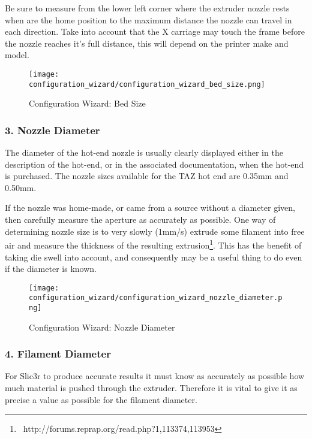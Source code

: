 Be sure to measure from the lower left corner where the extruder nozzle rests when are the home position to the maximum distance the nozzle can travel in each direction.  Take into account that the X carriage may touch the frame before the nozzle reaches it's full distance, this will depend on the printer make and model.

\begin{figure}[H]
\centering
\texttt{[image: configuration\_wizard/configuration\_wizard\_bed\_size.png]}
\caption{Configuration Wizard: Bed Size}
\label{fig:configuration_wizard_bed_size}
\end{figure}

\newpage
\subsubsection{3. Nozzle Diameter}
\label{sub:3_nozzle_diameter}
The diameter of the hot-end nozzle is usually clearly displayed either in the description of the hot-end, or in the associated documentation, when the hot-end is purchased.  The nozzle sizes available for the TAZ hot end are 0.35mm and 0.50mm.

If the nozzle was home-made, or came from a source without a diameter given, then carefully measure the aperture as accurately as possible.  One way of determining nozzle size is to very slowly (1mm/s) extrude some filament into free air and measure the thickness of the resulting extrusion\footnote{\	http://forums.reprap.org/read.php?1,113374,113953}.  This has the benefit of taking die swell into account, and consequently may be a useful thing to do even if the diameter is known.

\begin{figure}[H]
\centering
\texttt{[image: configuration\_wizard/configuration\_wizard\_nozzle\_diameter.png]}
\caption{Configuration Wizard: Nozzle Diameter}
\label{fig:configuration_wizard_nozzle_diameter}
\end{figure}

\newpage
\subsubsection{4. Filament Diameter}
\label{sub:4_filament_diameter}
For Slic3r to produce accurate results it must know as accurately as possible how much material is pushed through the extruder.  Therefore it is vital to give it as precise a value as possible for the filament diameter.

